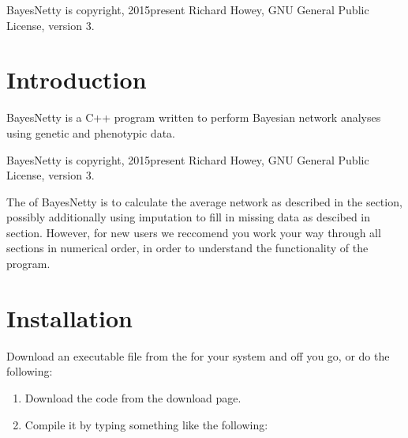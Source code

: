 \documentclass[letterpaper,10pt,english]{sphinxmanual}
\begin{document}
\sphinxAtStartPar
BayesNetty is copyright, 2015\sphinxhyphen{}present Richard Howey, GNU General Public License, version 3.

\sphinxstepscope


\section{Introduction}
\label{\detokenize{introduction:introduction}}\label{\detokenize{introduction:id1}}\label{\detokenize{introduction::doc}}
\sphinxAtStartPar
BayesNetty is a C++ program written to perform Bayesian network analyses using genetic and phenotypic data.

\sphinxAtStartPar
BayesNetty is copyright, 2015\sphinxhyphen{}present Richard Howey, GNU General Public License, version 3.

\begin{DUlineblock}{0em}
\item[] 
\item[] 
\end{DUlineblock}

\sphinxAtStartPar
The  of BayesNetty is to calculate the average network as described in the  section,
possibly additionally using imputation to fill in missing data as descibed in  section.
However, for new users we reccomend you work your way through all sections in numerical order,
in order to understand the functionality of the program.

\sphinxstepscope


\section{Installation}
\label{\detokenize{installation:installation}}\label{\detokenize{installation:id1}}\label{\detokenize{installation::doc}}
\sphinxAtStartPar
Download an executable file from the 
for your system and off you go, or do the following:
\begin{enumerate}
%
\item {} 
\sphinxAtStartPar
Download the code from the download page.

\item {} 
\sphinxAtStartPar
Compile it by typing something like the following:

\end{enumerate}
\end{document}
